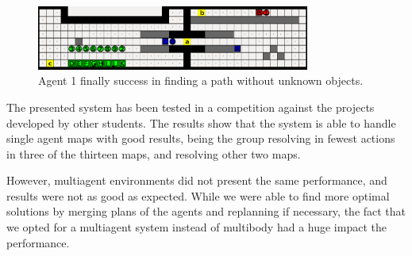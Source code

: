 \begin{figure}[htb]

\begin{center}

\includegraphics[width=0.8\textwidth]{figures/POMA_step2}

\caption{Agent 1 finally success in finding a path without unknown objects.}

\label{fig:poma_step2}

\end{center}

\end{figure}

The presented system has been tested in a competition against the projects developed by other students. The results show that the system is able to handle single agent maps with good results, being the group resolving in fewest actions in three of the thirteen maps, and resolving other two maps.

However, multiagent environments did not present the same performance, and results were not as good as expected. While we were able to find more optimal solutions by merging plans of the agents and replanning if necessary, the fact that we opted for a multiagent system instead of multibody had a huge impact the performance.
